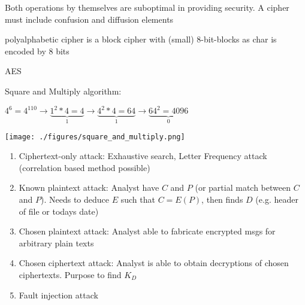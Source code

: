 \documentclass[landscape, a4paper]{article}
\begin{document}
\begin{minipage}[t]{0.198\pagewidth}
\begin{betterlist}
\begin{betterlist}
\begin{betterlist}
\begin{betterlist}
					\item Both operations by themselves are suboptimal in providing security. A cipher must include confusion and diffusion elements
				\end{betterlist}
			\end{betterlist}
			\item \alert{polyalphabetic cipher} is a block cipher with (small) $8$-bit-blocks as char is encoded by $8$ bits
			\item \alert{AES}
		\end{betterlist}
	\end{betterlist}
	\begin{betterlist}
		\item \alert{Square and Multiply algorithm:}
		\begin{betterlist}
			\item $4^6 = 4^{110} \rightarrow \underbrace{1^2 * 4 = 4}_{1} \rightarrow \underbrace{4^2 * 4 = 64}_{1} \rightarrow \underbrace{64^2 = 4096}_{0}$
		\end{betterlist}
		\texttt{[image: ./figures/square\_and\_multiply.png]}
	\end{betterlist}
	\begin{enumerate}
		\item Ciphertext-only attack: Exhaustive search, Letter Frequency attack (correlation based method possible)
		\item Known plaintext attack: Analyst have $C$ and $P$ (or partial match between $C$ and $P$). Needs to deduce $E$ such that $C=E(P)$, then finds $D$ (e.g. header of file or todays date)
		\item Chosen plaintext attack: Analyst able to fabricate encrypted msgs for arbitrary plain texts
		\item Chosen ciphertext attack: Analyst is able to obtain decryptions of chosen ciphertexts. Purpose to find $K_D$
		\item Fault injection attack
	\end{enumerate}
\end{minipage}
\end{document}
